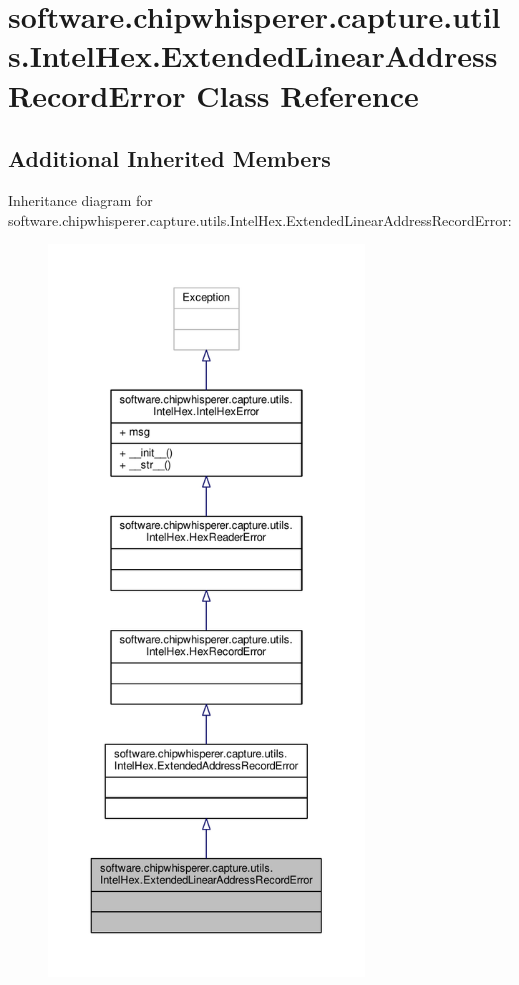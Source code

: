 \hypertarget{classsoftware_1_1chipwhisperer_1_1capture_1_1utils_1_1IntelHex_1_1ExtendedLinearAddressRecordError}{}\section{software.\+chipwhisperer.\+capture.\+utils.\+Intel\+Hex.\+Extended\+Linear\+Address\+Record\+Error Class Reference}
\label{classsoftware_1_1chipwhisperer_1_1capture_1_1utils_1_1IntelHex_1_1ExtendedLinearAddressRecordError}
\subsection*{Additional Inherited Members}


Inheritance diagram for software.\+chipwhisperer.\+capture.\+utils.\+Intel\+Hex.\+Extended\+Linear\+Address\+Record\+Error\+:\nopagebreak
\begin{figure}[H]
\begin{center}
\leavevmode
\includegraphics[height=550pt]{d3/d44/classsoftware_1_1chipwhisperer_1_1capture_1_1utils_1_1IntelHex_1_1ExtendedLinearAddressRecordError__inherit__graph}
\end{center}
\end{figure}


